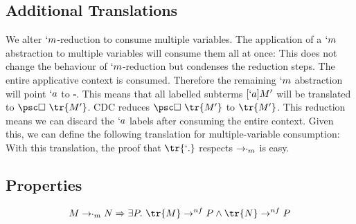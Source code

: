 \subsection{Additional Translations}
We alter $`m$-reduction to consume multiple variables.
The application of a $`m$ abstraction to multiple variables will consume them all at once:
This does not change the behaviour of $`m$-reduction but condenses the reduction steps.
The entire applicative context is consumed.
Therefore the remaining $`m$ abstraction will point $`a$ to $\square$.
This means that all labelled subterms $[`a]M'$ will be translated to $\psc \square\ \tr{M'}$.
CDC reduces $\psc \square\ \tr{M'}$ to $\tr{M'}$.
This reduction means we can discard the $`a$ labels after consuming the entire context.
Given this, we can define the following translation for multiple-variable consumption:
With this translation, the proof that $\tr{`.}$ respects $\to_{`m}$ is easy.

\subsection{Properties}

\begin{theorem}[Soundness of $\tr{`.}$]\label{theorem:soundness}
\[ M \to_{`m} N \Rightarrow \exists P.\ \tr{M} \to^{nf} P \land \tr{N} \to^{nf} P \]
\end{theorem}

